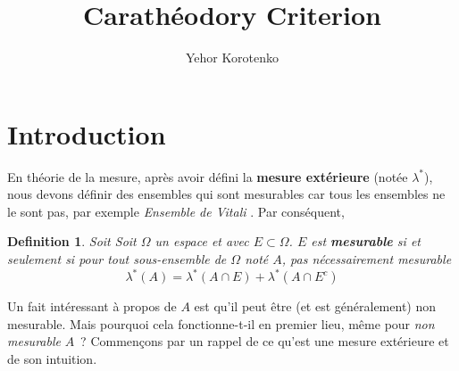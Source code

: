\documentclass[a4paper]{article}
\author{Yehor Korotenko}
\title{Carathéodory Criterion}%
\newtheorem{definition}{Definition}[section]
\begin{document}

\section{Introduction}%

   En théorie de la mesure, après avoir défini la %
\textbf{mesure extérieure}%
(notée $\lambda^*$), nous devons définir des ensembles qui sont mesurables car tous les ensembles ne le sont pas, par exemple %
\textit{Ensemble de Vitali}%
. Par conséquent,
\begin{definition}
Soit 
Soit $\Omega$ un espace et avec $E \subset \Omega$. $E$ est \textbf{mesurable} si et seulement si pour tout sous-ensemble de $\Omega$ noté $A$, pas nécessairement mesurable
\[
\lambda^*(A) = \lambda^*(A \cap E) + \lambda^*(A \cap E^c)
\] 
\end{definition}%

Un fait intéressant à propos de $A$ est qu'il peut être (et est généralement)
non mesurable. Mais pourquoi cela fonctionne-t-il en premier lieu, même pour
\textit{non mesurable}%
 $A$ ? Commençons par un rappel de ce qu'est une mesure extérieure et de son intuition.
\end{document}
